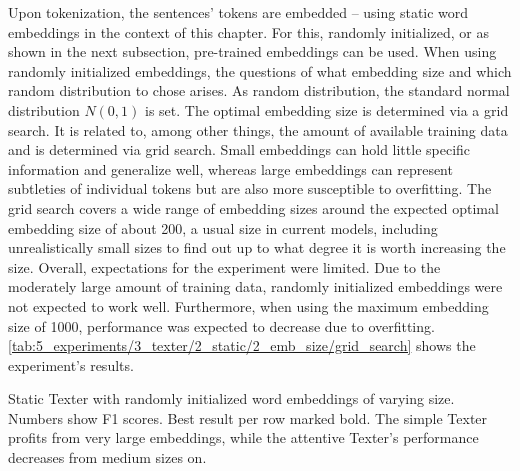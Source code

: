 Upon tokenization, the sentences' tokens are embedded -- using static word embeddings in the context of this chapter. For this, randomly initialized, or as shown in the next subsection, pre-trained embeddings can be used. When using randomly initialized embeddings, the questions of what embedding size and which random distribution to chose arises. As random distribution, the standard normal distribution $N(0, 1)$ is set. The optimal embedding size is determined via a grid search. It is related to, among other things, the amount of available training data and is determined via grid search. Small embeddings can hold little specific information and generalize well, whereas large embeddings can represent subtleties of individual tokens but are also more susceptible to overfitting. The grid search covers a wide range of embedding sizes around the expected optimal embedding size of about 200, a usual size in current models, including unrealistically small sizes to find out up to what degree it is worth increasing the size. Overall, expectations for the experiment were limited. Due to the moderately large amount of training data, randomly initialized embeddings were not expected to work well. Furthermore, when using the maximum embedding size of 1000, performance was expected to decrease due to overfitting. \autoref{tab:5_experiments/3_texter/2_static/2_emb_size/grid_search} shows the experiment's results.

\begin{table}[t]
    \centering
    
    \caption{Static Texter with randomly initialized word embeddings of varying size. Numbers show F1 scores. Best result per row marked bold. The simple Texter profits from very large embeddings, while the attentive Texter's performance decreases from medium sizes on.}
    \label{tab:5_experiments/3_texter/2_static/2_emb_size/grid_search}
\end{table}

